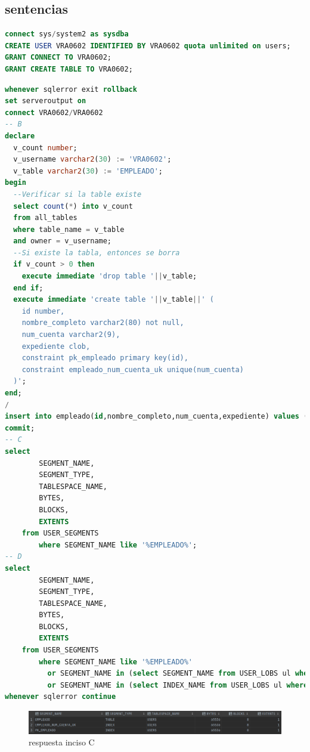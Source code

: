 \documentclass[journal]{IEEEtran}
\begin{document}
\subsection{sentencias}
\begin{lstlisting}[language=sql, caption=s-00-crea-usuario.sql,label={lst:codigo1}]
connect sys/system2 as sysdba
CREATE USER VRA0602 IDENTIFIED BY VRA0602 quota unlimited on users;
GRANT CONNECT TO VRA0602;
GRANT CREATE TABLE TO VRA0602;
\end{lstlisting}
\begin{lstlisting}[language=sql, caption=s-01-crear-tabla.sql,label={lst:codigo2}]
whenever sqlerror exit rollback
set serveroutput on
connect VRA0602/VRA0602
-- B
declare
  v_count number;
  v_username varchar2(30) := 'VRA0602';
  v_table varchar2(30) := 'EMPLEADO';
begin
  --Verificar si la table existe
  select count(*) into v_count
  from all_tables
  where table_name = v_table
  and owner = v_username;
  --Si existe la tabla, entonces se borra
  if v_count > 0 then
    execute immediate 'drop table '||v_table;
  end if;
  execute immediate 'create table '||v_table||' (
    id number,
    nombre_completo varchar2(80) not null,
    num_cuenta varchar2(9),
    expediente clob,
    constraint pk_empleado primary key(id),
    constraint empleado_num_cuenta_uk unique(num_cuenta)
  )';
end;
/
insert into empleado(id,nombre_completo,num_cuenta,expediente) values (1,'Vicente Romero Andrade','312097792',null);
commit;
-- C
select 
        SEGMENT_NAME, 
        SEGMENT_TYPE, 
        TABLESPACE_NAME,
        BYTES,
        BLOCKS,
        EXTENTS 
    from USER_SEGMENTS 
        where SEGMENT_NAME like '%EMPLEADO%';
-- D
select
        SEGMENT_NAME,
        SEGMENT_TYPE,
        TABLESPACE_NAME,
        BYTES,
        BLOCKS,
        EXTENTS
    from USER_SEGMENTS
        where SEGMENT_NAME like '%EMPLEADO%'
          or SEGMENT_NAME in (select SEGMENT_NAME from USER_LOBS ul where ul.TABLE_NAME = 'EMPLEADO')
          or SEGMENT_NAME in (select INDEX_NAME from USER_LOBS ul where ul.TABLE_NAME = 'EMPLEADO');
whenever sqlerror continue
\end{lstlisting}
\begin{figure}[H]
  \centering
  \includegraphics[scale=.22]{captura_1.png}
   \caption{respuesta inciso C}
   \label{fig:validador_1}
\end{figure}
\end{document}
